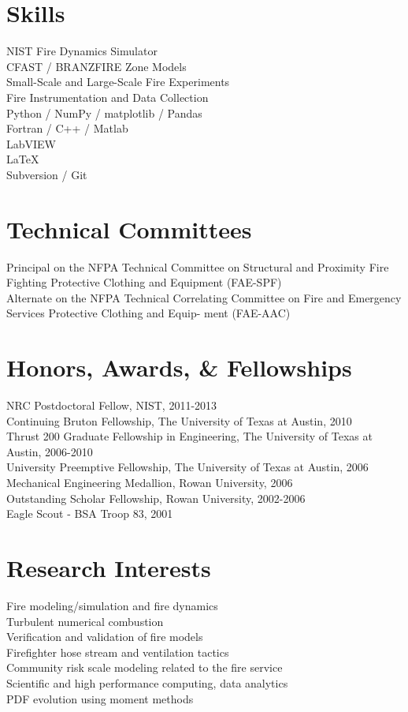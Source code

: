 \documentclass[10pt,letterpaper]{article}
\begin{document}

\section*{Skills}
NIST Fire Dynamics Simulator \\
CFAST / BRANZFIRE Zone Models \\
Small-Scale and Large-Scale Fire Experiments \\
Fire Instrumentation and Data Collection \\
Python / NumPy / matplotlib / Pandas \\
Fortran / C++ / Matlab \\
LabVIEW \\
\LaTeX \\
Subversion / Git \\

\section*{Technical Committees}

Principal on the NFPA Technical Committee on Structural and Proximity Fire Fighting Protective Clothing and Equipment (FAE-SPF) \\
\vskip1pt
Alternate on the NFPA Technical Correlating Committee on Fire and Emergency Services Protective Clothing and Equip- ment (FAE-AAC) \\

\section*{Honors, Awards, \& Fellowships}

NRC Postdoctoral Fellow, NIST, 2011-2013 \\
Continuing Bruton Fellowship, The University of Texas at Austin, 2010 \\
Thrust 200 Graduate Fellowship in Engineering, The University of Texas at Austin, 2006-2010 \\
University Preemptive Fellowship, The University of Texas at Austin, 2006 \\
Mechanical Engineering Medallion, Rowan University, 2006 \\
Outstanding Scholar Fellowship, Rowan University, 2002-2006 \\
Eagle Scout - BSA Troop 83, 2001 \\

\section*{Research Interests}
Fire modeling/simulation and fire dynamics \\
Turbulent numerical combustion \\
Verification and validation of fire models \\
Firefighter hose stream and ventilation tactics \\
Community risk scale modeling related to the fire service \\
Scientific and high performance computing, data analytics \\
PDF evolution using moment methods \\

\bigskip
\end{document}

